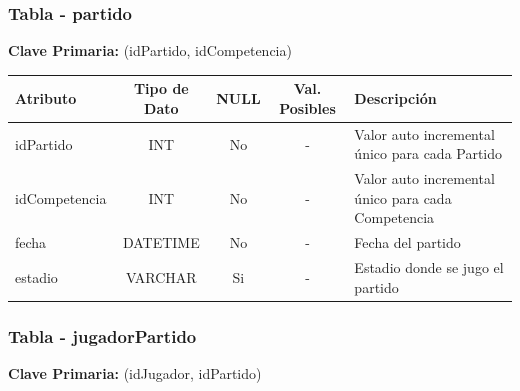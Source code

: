 \subsubsection{Tabla - partido}

\textbf{Clave Primaria: } (idPartido, idCompetencia)

\begin{table}[H]
	\centering
	\begin{tabularx}{\textwidth}{|l|c|c|c|X|} \hline
		\textbf{Atributo} & \textbf{Tipo de Dato} & \textbf{NULL} & \textbf{Val. Posibles} & \textbf{Descripción} \\ \hline
		idPartido  & INT & No & - & Valor auto incremental único para cada Partido \\ \hline
		idCompetencia  & INT & No & - & Valor auto incremental único para cada Competencia \\ \hline
		fecha & DATETIME & No & - & Fecha del partido\\ \hline
		estadio & VARCHAR & Si & - & Estadio donde se jugo el partido \\ \hline
	\end{tabularx}
\end{table}

\subsubsection{Tabla - jugadorPartido}

\textbf{Clave Primaria: } (idJugador, idPartido)

